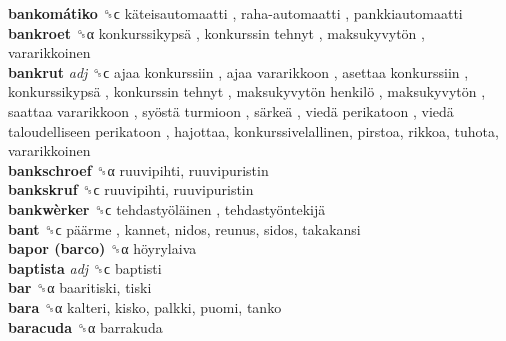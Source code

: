 \textbf{bankomátiko} ␝ϲ   käteisautomaatti ,  raha-automaatti , pankkiautomaatti  \\
\textbf{bankroet} ␝α   konkurssikypsä ,  konkurssin tehnyt ,  maksukyvytön , vararikkoinen  \\
\textbf{bankrut} \emph{adj}  ␝ϲ   ajaa konkurssiin ,  ajaa vararikkoon ,  asettaa konkurssiin ,  konkurssikypsä ,  konkurssin tehnyt ,  maksukyvytön henkilö ,  maksukyvytön ,  saattaa vararikkoon ,  syöstä turmioon ,  särkeä ,  viedä perikatoon ,  viedä taloudelliseen perikatoon , hajottaa, konkurssivelallinen, pirstoa, rikkoa, tuhota, vararikkoinen  \\
\textbf{bankschroef} ␝α  ruuvipihti, ruuvipuristin  \\
\textbf{bankskruf} ␝ϲ  ruuvipihti, ruuvipuristin  \\
\textbf{bankwèrker} ␝ϲ   tehdastyöläinen ,  tehdastyöntekijä   \\
\textbf{bant} ␝ϲ   päärme , kannet, nidos, reunus, sidos, takakansi  \\
\textbf{bapor (barco)} ␝α   höyrylaiva   \\
\textbf{baptista} \emph{adj}  ␝ϲ  baptisti  \\
\textbf{bar} ␝α  baaritiski, tiski  \\
\textbf{bara} ␝α  kalteri, kisko, palkki, puomi, tanko  \\
\textbf{baracuda} ␝α  barrakuda  \\
